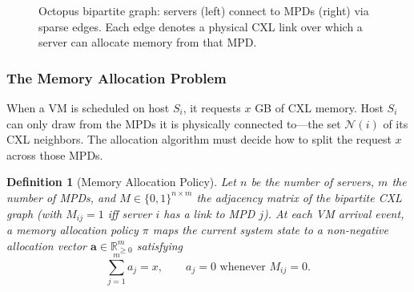 \documentclass[11pt]{article}
\newtheorem{definition}{Definition}
\begin{document}
\begin{figure}[H]
\centering
{}
\caption{Octopus bipartite graph: servers (left) connect to MPDs (right) via
sparse edges.  Each edge denotes a physical CXL link over which a server can
allocate memory from that MPD.}
\label{fig:bipartite}
\end{figure}

\subsubsection*{The Memory Allocation Problem}

When a VM is scheduled on host $S_i$, it requests $x$ GB of CXL memory.
Host $S_i$ can only draw from the MPDs it is physically connected to---the
set $\mathcal{N}(i)$ of its CXL neighbors.  The allocation algorithm must
decide how to split the request $x$ across those MPDs.

\begin{definition}[Memory Allocation Policy]
Let $n$ be the number of servers, $m$ the number of MPDs, and $M \in \{0,1\}^{n
\times m}$ the adjacency matrix of the bipartite CXL graph (with $M_{ij} = 1$
iff server $i$ has a link to MPD $j$).  At each VM arrival event, a
\emph{memory allocation policy} $\pi$ maps the current system state to a
non-negative allocation vector $\mathbf{a} \in \mathbb{R}_{\ge 0}^{m}$
satisfying
\[
    \sum_{j=1}^{m} a_j = x,
    \qquad
    a_j = 0 \text{ whenever } M_{ij} = 0.
\]
\end{definition}
\end{document}
